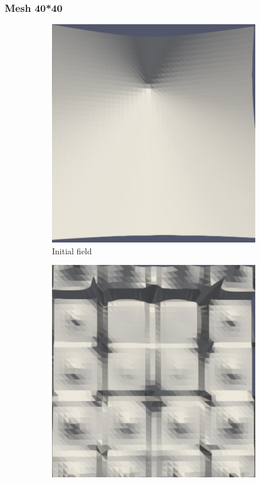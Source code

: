 \documentclass{article}
\begin{document}
\subsubsection{Mesh 40*40}
\begin{figure}[hbt!]
  \begin{subfigure}{0.4\textwidth}
        \centering
        \includegraphics[width=\textwidth]{Figures/5e-5 40x40/for n 1.png}
        \caption{Initial field}
  \end{subfigure}
  \hfill
  \begin{subfigure}{0.4\textwidth}
        \centering
        \includegraphics[width=\textwidth]{Figures/5e-5 40x40/for n 20.png}

\end{subfigure}
\end{figure}
\end{document}
